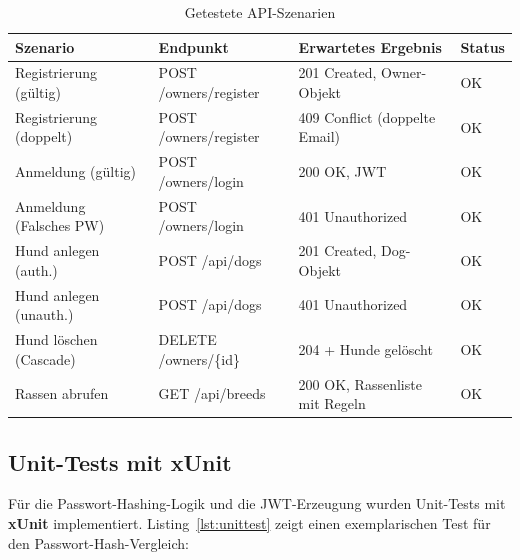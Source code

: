\begin{table}[H]
  \centering
  \caption{Getestete API-Szenarien}
  \label{tab:test-szenarien}
  \small
  \begin{tabularx}{\textwidth}{|l|l|Y|l|}
    \hline
    \textbf{Szenario} & \textbf{Endpunkt} & \textbf{Erwartetes Ergebnis} &
    \textbf{Status} \\
    \hline
    Registrierung (gültig)     & POST /owners/register & 201 Created, Owner-Objekt    & OK \\
    \hline
    Registrierung (doppelt)    & POST /owners/register & 409 Conflict (doppelte Email) & OK \\
    \hline
    Anmeldung (gültig)         & POST /owners/login    & 200 OK, JWT                  & OK \\
    \hline
    Anmeldung (Falsches PW)    & POST /owners/login    & 401 Unauthorized             & OK \\
    \hline
    Hund anlegen (auth.)       & POST /api/dogs        & 201 Created, Dog-Objekt      & OK \\
    \hline
    Hund anlegen (unauth.)     & POST /api/dogs        & 401 Unauthorized             & OK \\
    \hline
    Hund löschen (Cascade)     & DELETE /owners/\{id\} & 204 + Hunde gelöscht         & OK \\
    \hline
    Rassen abrufen             & GET /api/breeds       & 200 OK, Rassenliste mit Regeln & OK \\
    \hline
  \end{tabularx}
\end{table}

\subsection{Unit-Tests mit xUnit}
\label{subsec:xunit}

Für die Passwort-Hashing-Logik und die JWT-Erzeugung wurden Unit-Tests mit
\textbf{xUnit} implementiert. Listing~\ref{lst:unittest} zeigt einen exemplarischen Test
für den Passwort-Hash-Vergleich:

